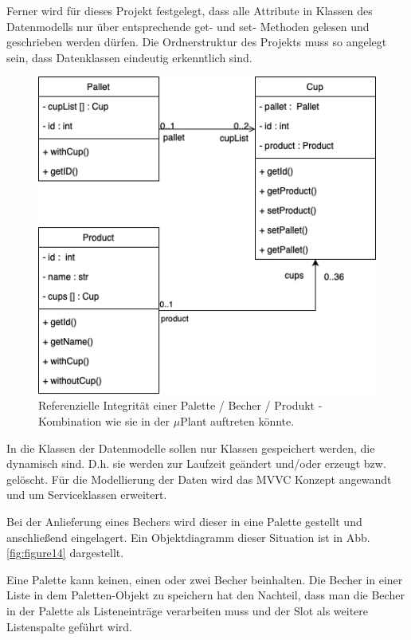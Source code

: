Ferner wird für dieses Projekt festgelegt, dass alle Attribute in Klassen des Datenmodells nur über entsprechende 
get- und set- Methoden gelesen und geschrieben werden dürfen.
Die Ordnerstruktur des Projekts muss so angelegt sein, dass Datenklassen eindeutig erkenntlich sind. 

\vspace{1cm}
\begin{figure}
        \caption[Beispiel: Referenzielle Integrität]
        {\small Referenzielle Integrität einer Palette / Becher / Produkt - Kombination wie sie in der $\mu$Plant
        auftreten könnte. }\label{fig:figure9}
        \includegraphics[width = \textwidth ]{Bilder/BeispielRefInt}
        \centering
\end{figure}

In die Klassen der Datenmodelle sollen nur Klassen gespeichert werden, die dynamisch sind. D.h. sie werden zur Laufzeit geändert und/oder
erzeugt bzw. gelöscht. 
Für die Modellierung der Daten wird das MVVC Konzept angewandt und um Serviceklassen erweitert.

Bei der Anlieferung eines Bechers wird dieser in eine Palette gestellt und anschließend eingelagert.
Ein Objektdiagramm dieser Situation ist in Abb.\ref{fig:figure14} dargestellt.

Eine Palette kann keinen, einen oder zwei Becher beinhalten.
Die Becher in einer Liste in dem Paletten-Objekt zu speichern hat den Nachteil, dass man die Becher in der Palette als Listeneinträge verarbeiten muss
und der Slot als weitere Listenspalte geführt wird.

